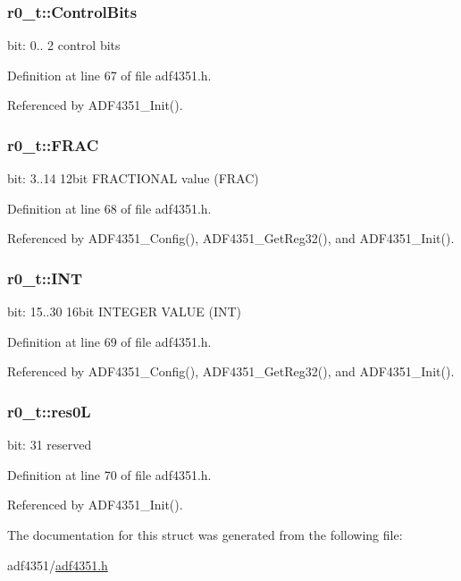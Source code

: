 \subsubsection[{\texorpdfstring{Control\+Bits}{ControlBits}}]{ r0\+\_\+t\+::\+Control\+Bits}\hypertarget{structr0__t_aad2911768ed7dd38e899b81d517dda08}{}\label{structr0__t_aad2911768ed7dd38e899b81d517dda08}
bit\+: 0.. 2 control bits 

Definition at line 67 of file adf4351.\+h.



Referenced by A\+D\+F4351\+\_\+\+Init().

\subsubsection[{\texorpdfstring{F\+R\+AC}{FRAC}}]{ r0\+\_\+t\+::\+F\+R\+AC}\hypertarget{structr0__t_adc22c0b86ef296065f01c8800d4f5d52}{}\label{structr0__t_adc22c0b86ef296065f01c8800d4f5d52}
bit\+: 3..14 12bit F\+R\+A\+C\+T\+I\+O\+N\+AL value (F\+R\+AC) 

Definition at line 68 of file adf4351.\+h.



Referenced by A\+D\+F4351\+\_\+\+Config(), A\+D\+F4351\+\_\+\+Get\+Reg32(), and A\+D\+F4351\+\_\+\+Init().

\subsubsection[{\texorpdfstring{I\+NT}{INT}}]{ r0\+\_\+t\+::\+I\+NT}\hypertarget{structr0__t_a1d7f06769cdf259c9858033cb164e31d}{}\label{structr0__t_a1d7f06769cdf259c9858033cb164e31d}
bit\+: 15..30 16bit I\+N\+T\+E\+G\+ER V\+A\+L\+UE (I\+NT) 

Definition at line 69 of file adf4351.\+h.



Referenced by A\+D\+F4351\+\_\+\+Config(), A\+D\+F4351\+\_\+\+Get\+Reg32(), and A\+D\+F4351\+\_\+\+Init().

\subsubsection[{\texorpdfstring{res0L}{res0L}}]{ r0\+\_\+t\+::res0L}\hypertarget{structr0__t_ab7402e75c2a633ce378078407151341d}{}\label{structr0__t_ab7402e75c2a633ce378078407151341d}
bit\+: 31 reserved 

Definition at line 70 of file adf4351.\+h.



Referenced by A\+D\+F4351\+\_\+\+Init().



The documentation for this struct was generated from the following file\+:\begin{DoxyCompactItemize}
\item 
adf4351/\hyperlink{adf4351_8h}{adf4351.\+h}\end{DoxyCompactItemize}
